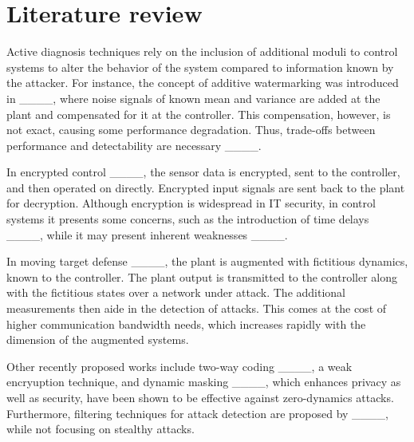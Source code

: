 \section{Literature review}
Active diagnosis techniques rely on the inclusion of additional moduli to control systems
to alter the behavior of the system compared to information known by the attacker. 
For instance, the concept of additive watermarking was introduced in ____, where noise signals of known mean and variance are added at the plant and compensated for it at the controller. 
This compensation, however, is not exact, causing some performance degradation. Thus, trade-offs between performance and detectability  are necessary ____.

In encrypted control ____, the sensor data is encrypted, sent to the controller, and then operated on directly. Encrypted input signals are sent back to the plant for decryption. Although encryption is widespread in IT security, in control systems it presents some concerns, such as the introduction of time delays ____, while it may present inherent weaknesses ____.

In moving target defense ____, the plant is augmented with fictitious dynamics, known to the controller. The plant output is transmitted to the controller along with the fictitious states over a network under attack. 
The additional measurements then aide in the detection of attacks. 
This comes at the cost of higher communication bandwidth needs, which increases rapidly with the dimension of the augmented systems.

Other recently proposed works include two-way coding ____, a weak encryuption technique, and dynamic masking ____, which enhances privacy as well as security, have been shown to be effective against zero-dynamics attacks.
Furthermore, filtering techniques for attack detection are proposed by ____, while not focusing on stealthy attacks.

